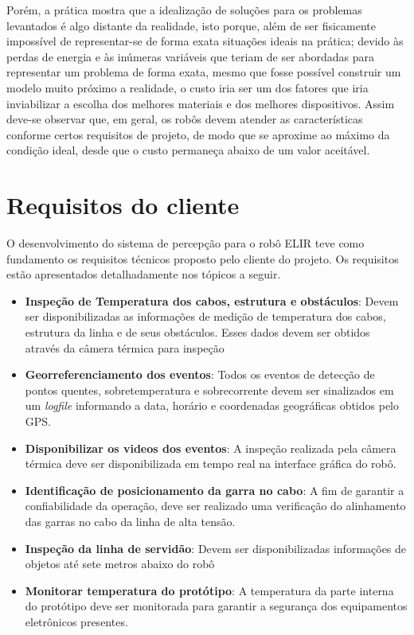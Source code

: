 Porém, a prática mostra que a idealização de soluções para os problemas levantados é algo distante da realidade, isto porque, além de ser fisicamente impossível de representar-se de forma exata situações ideais na prática; devido às perdas de energia e às inúmeras variáveis que teriam de ser abordadas para representar um problema de forma exata, mesmo que fosse possível construir um modelo muito próximo a realidade, o custo iria ser um dos fatores que iria inviabilizar a escolha dos melhores materiais e dos melhores dispositivos. Assim deve-se observar que, em geral, os robôs devem atender as características conforme certos requisitos de projeto, de modo que se aproxime ao máximo da condição ideal, desde que o custo permaneça abaixo de um valor aceitável. 


\section{Requisitos do cliente}
\label{sec:reqc}

O desenvolvimento do sistema de percepção para o robô ELIR teve como fundamento os requisitos técnicos proposto pelo cliente do projeto. Os requisitos estão apresentados detalhadamente nos tópicos a seguir.
    
    \begin{itemize}
    	\item{\textbf{Inspeção de Temperatura dos cabos, estrutura e obstáculos}}: Devem ser disponibilizadas as informações de medição de temperatura dos cabos, estrutura da linha e de seus obstáculos. Esses dados devem ser obtidos através da câmera térmica para inspeção
    	\item{\textbf{Georreferenciamento dos eventos}}: Todos os eventos de detecção de pontos quentes, sobretemperatura e sobrecorrente devem ser sinalizados em um \textit{logfile} informando a data, horário e coordenadas geográficas obtidos pelo GPS.
    	\item{\textbf{Disponibilizar os videos dos eventos}}: A inspeção realizada pela câmera térmica deve ser disponibilizada em tempo real na interface gráfica do robô.
    	\item{\textbf{Identificação de posicionamento da garra no cabo}}: A fim de garantir a confiabilidade da operação, deve ser realizado uma verificação do alinhamento das garras no cabo da linha de alta tensão.
    	\item{\textbf{Inspeção da linha de servidão}}: Devem ser disponibilizadas informações de objetos até sete metros abaixo do robô
    	\item \textbf{Monitorar temperatura do protótipo}: A temperatura da parte interna do protótipo deve ser monitorada para garantir a segurança dos equipamentos eletrônicos presentes.
	\end{itemize}

